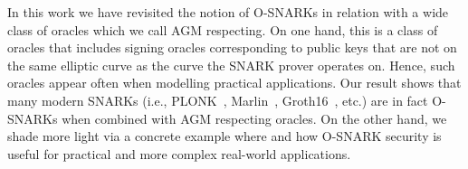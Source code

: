 In this work we have revisited the notion of O-SNARKs in relation with a wide class of oracles which we call AGM 
respecting. On one hand, this is a class of oracles that includes signing oracles corresponding to public keys that 
are not on the same elliptic curve as the curve the SNARK prover operates on. Hence, such oracles appear often 
when modelling practical applications. Our result shows that many modern SNARKs (i.e., PLONK~\cite{plonk}, Marlin~\cite{marlin}, Groth16~\cite{groth16}, etc.) 
are in fact O-SNARKs when combined with AGM respecting oracles. On the other hand, we shade more light via a concrete 
example where and how O-SNARK security is useful for practical and more complex real-world applications. 

